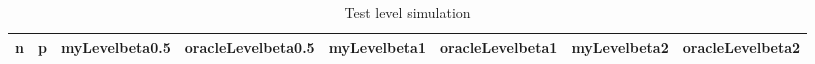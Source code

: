 \begin{table}[ht]
\centering
\begin{tabular}{rccccccc}
  \hline
n & p & myLevelbeta0.5 & oracleLevelbeta0.5 & myLevelbeta1 & oracleLevelbeta1 & myLevelbeta2 & oracleLevelbeta2 \\ 
  \hline
\hline
\end{tabular}
\caption{Test level simulation} 
\label{biaoge1}
\end{table}
